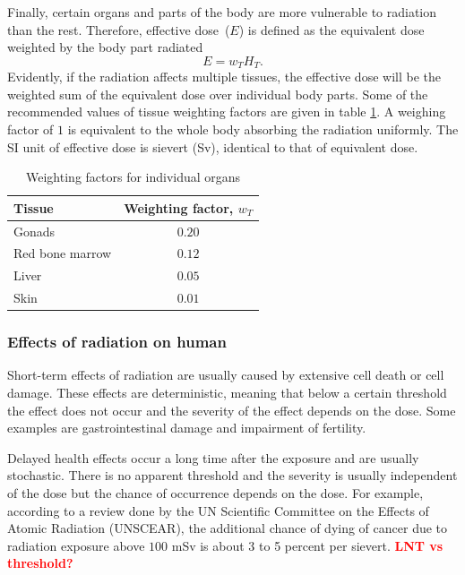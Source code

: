 \documentclass[preprint,aip,pra]{revtex4-1}
\newcommand{\red}[1]{\textcolor{red}{\bf #1}}
\begin{document}
        Finally, certain organs and parts of the body are more vulnerable to radiation than the rest.
        Therefore, effective dose~($E$) is defined as the equivalent dose weighted by the body part
        radiated
        \begin{equation}
            E = w_T H_T.
        \end{equation}
        Evidently, if the radiation affects multiple tissues, the effective dose will be the weighted
        sum of the equivalent dose over individual body parts. Some of the recommended values of tissue
        weighting factors are given in table \ref{tab:eff}. A weighing factor of $1$ is equivalent to the
        whole body absorbing the radiation uniformly. The SI unit of effective dose is sievert (Sv),
        identical to that of equivalent dose.
        \begin{table}
            \label{tab:eff}
            \centering
            \caption{Weighting factors for individual organs\cite{icrp74}}
            \begin{ruledtabular}
                \begin{tabular}{l c}
                Tissue & Weighting factor, $w_T$\\
                \hline
                Gonads & $0.20$\\
                Red bone marrow & $0.12$ \\
                Liver & $0.05$ \\
                Skin & $0.01$ \\
                \end{tabular}
            \end{ruledtabular}
        \end{table}
        \subsubsection{Effects of radiation on human}
        Short-term effects of radiation are usually caused by extensive cell death or cell damage.\cite{u16}
        These effects are deterministic, meaning that below a certain threshold the effect does not occur and
        the severity of the effect depends on the dose. Some examples are gastrointestinal damage and impairment
        of fertility.\cite{u16, l01}

        Delayed health effects occur a long time after the exposure and are usually stochastic. There is
        no apparent threshold and the severity is usually independent of the dose but
        the chance of occurrence depends on the dose.\cite{u16,l01}
        For example, according to a review done by the UN Scientific Committee on the Effects of Atomic Radiation
        (UNSCEAR), the additional chance of dying of cancer due to radiation exposure above $100$ mSv is
        about 3 to 5 percent per sievert.\cite{unscear12}
        \red{LNT vs threshold?}
\end{document}
